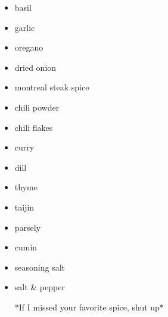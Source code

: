 \documentclass[11pt, a4paper]{article}
\begin{document}
\vspace{1pc}

\begin{itemize}
\item basil
\item garlic
\item oregano
\item dried onion
\item montreal steak spice
\item chili powder
\item chili flakes
\item curry
\item dill
\item thyme
\item taijin
\item parsely
\item cumin
\item seasoning salt
\item salt \& pepper
\par
*If I missed your favorite spice, shut up*
\end{itemize}
\end{document}

